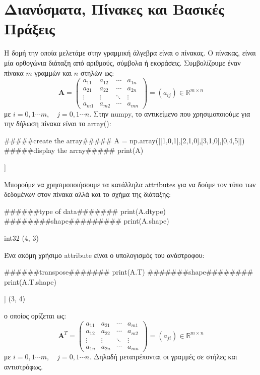 \chapter{Διανύσματα, Πίνακες και Βασικές Πράξεις}
Η δομή την οποία μελετάμε στην γραμμική άλγεβρα είναι ο πίνακας. Ο πίνακας, είναι μία ορθογώνια διάταξη από αριθμούς, σύμβολα ή εκφράσεις. Συμβολίζουμε έναν πίνακα $m$ γραμμών και $n$ στηλών ως:
\begin{equation}
\mathbf{A}=\left(\begin{array}{cccc}
a_{11} & a_{12} & \cdots & a_{1 n} \\
a_{21} & a_{22} & \cdots & a_{2 n} \\
\vdots & \vdots & \ddots & \vdots \\
a_{m 1} & a_{m 2} & \cdots & a_{m n}
\end{array}\right)=\left(a_{i j}\right) \in \mathbb{R}^{m \times n}
\end{equation}
με $i=0,1 \cdots m, \quad j=0,1 \cdots n$. Στην {\en numpy}, το αντικείμενο που χρησιμοποιούμε για την δήλωση πίνακα είναι το {\en array()}:
\en
\begin{python}
#####create the array#####
A = np.array([[1,0,1],[2,1,0],[3,1,0],[0,4,5]])
#####display the array#####
print(A)
\end{python}
\vspace*{-0.7cm}
\begin{codeout}
[[1 0 1]
 [2 1 0]
 [3 1 0]
 [0 4 5]]
\end{codeout}
\gr

Μπορούμε να χρησιμοποιήσουμε τα κατάλληλα {\en attributes} για να δούμε τον τύπο των δεδομένων στον πίνακα αλλά και το σχήμα της διάταξης:
\newpage
\en
\begin{python}
######type of data#######
print(A.dtype)
########shape#########
print(A.shape)
\end{python}
\vspace*{-0.7cm}
\begin{codeout}
int32
(4, 3)
\end{codeout}
\gr
Ένα ακόμη χρήσιμο {\en attribute} είναι ο υπολογισμός του ανάστροφου:
\en
\begin{python}
######transpose#######
print(A.T)
#######shape########
print(A.T.shape)
\end{python}
\vspace*{-0.7cm}
\begin{codeout}
[[1 2 3 0]
 [0 1 1 4]
 [1 0 0 5]]
(3, 4)
\end{codeout}
\gr
ο οποίος ορίζεται ως:
\begin{equation}
{\mathbf{A}}^T=\left(\begin{array}{cccc}
a_{11} & a_{21} & \cdots & a_{m 1} \\
a_{12} & a_{22} & \cdots & a_{m 2} \\
\vdots & \vdots & \ddots & \vdots \\
a_{1 n} & a_{2 n} & \cdots & a_{m n}
\end{array}\right)=\left(a_{j i}\right) \in \mathbb{R}^{m \times n}
\end{equation}
με $i=0,1 \cdots m, \quad j=0,1 \cdots n$. Δηλαδή μετατρέπονται οι γραμμές σε στήλες και αντιστρόφως.

